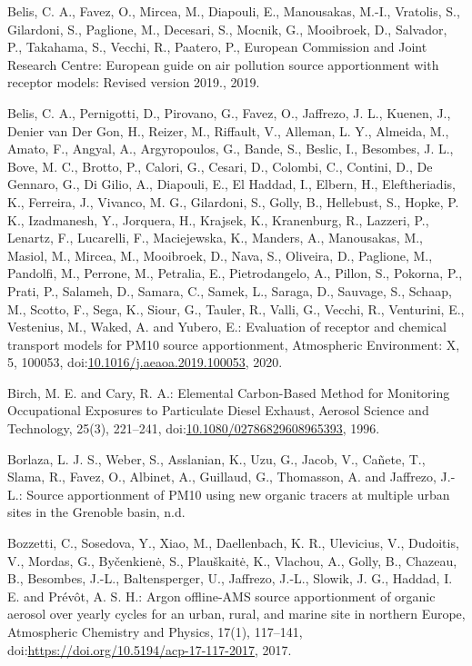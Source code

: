 \documentclass[
]{article}
\begin{document}
Belis, C. A., Favez, O., Mircea, M., Diapouli, E., Manousakas, M.-I.,
Vratolis, S., Gilardoni, S., Paglione, M., Decesari, S., Mocnik, G.,
Mooibroek, D., Salvador, P., Takahama, S., Vecchi, R., Paatero, P.,
European Commission and Joint Research Centre: European guide on air
pollution source apportionment with receptor models: Revised version
2019., 2019.

Belis, C. A., Pernigotti, D., Pirovano, G., Favez, O., Jaffrezo, J. L.,
Kuenen, J., Denier van Der Gon, H., Reizer, M., Riffault, V., Alleman,
L. Y., Almeida, M., Amato, F., Angyal, A., Argyropoulos, G., Bande, S.,
Beslic, I., Besombes, J. L., Bove, M. C., Brotto, P., Calori, G.,
Cesari, D., Colombi, C., Contini, D., De Gennaro, G., Di Gilio, A.,
Diapouli, E., El Haddad, I., Elbern, H., Eleftheriadis, K., Ferreira,
J., Vivanco, M. G., Gilardoni, S., Golly, B., Hellebust, S., Hopke, P.
K., Izadmanesh, Y., Jorquera, H., Krajsek, K., Kranenburg, R., Lazzeri,
P., Lenartz, F., Lucarelli, F., Maciejewska, K., Manders, A.,
Manousakas, M., Masiol, M., Mircea, M., Mooibroek, D., Nava, S.,
Oliveira, D., Paglione, M., Pandolfi, M., Perrone, M., Petralia, E.,
Pietrodangelo, A., Pillon, S., Pokorna, P., Prati, P., Salameh, D.,
Samara, C., Samek, L., Saraga, D., Sauvage, S., Schaap, M., Scotto, F.,
Sega, K., Siour, G., Tauler, R., Valli, G., Vecchi, R., Venturini, E.,
Vestenius, M., Waked, A. and Yubero, E.: Evaluation of receptor and
chemical transport models for PM10 source apportionment, Atmospheric
Environment: X, 5, 100053,
doi:\href{https://doi.org/10.1016/j.aeaoa.2019.100053}{10.1016/j.aeaoa.2019.100053},
2020.

Birch, M. E. and Cary, R. A.: Elemental Carbon-Based Method for
Monitoring Occupational Exposures to Particulate Diesel Exhaust, Aerosol
Science and Technology, 25(3), 221--241,
doi:\href{https://doi.org/10.1080/02786829608965393}{10.1080/02786829608965393},
1996.

Borlaza, L. J. S., Weber, S., Asslanian, K., Uzu, G., Jacob, V., Cañete,
T., Slama, R., Favez, O., Albinet, A., Guillaud, G., Thomasson, A. and
Jaffrezo, J.-L.: Source apportionment of PM10 using new organic tracers
at multiple urban sites in the Grenoble basin, n.d.

Bozzetti, C., Sosedova, Y., Xiao, M., Daellenbach, K. R., Ulevicius, V.,
Dudoitis, V., Mordas, G., Byčenkienė, S., Plauškaitė, K., Vlachou, A.,
Golly, B., Chazeau, B., Besombes, J.-L., Baltensperger, U., Jaffrezo,
J.-L., Slowik, J. G., Haddad, I. E. and Prévôt, A. S. H.: Argon
offline-AMS source apportionment of organic aerosol over yearly cycles
for an urban, rural, and marine site in northern Europe, Atmospheric
Chemistry and Physics, 17(1), 117--141,
doi:\href{https://doi.org/https://doi.org/10.5194/acp-17-117-2017}{https://doi.org/10.5194/acp-17-117-2017},
2017.
\end{document}
